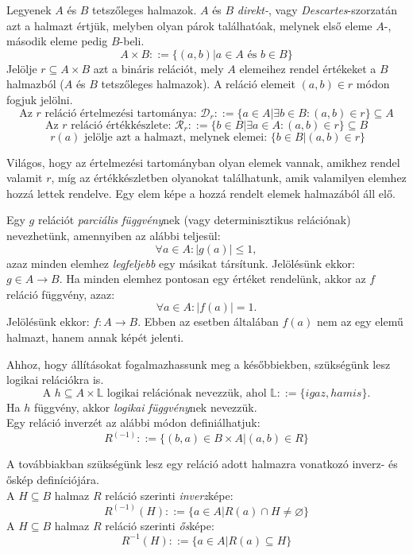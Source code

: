 \documentclass[12pt]{article}
\begin{document}
	Legyenek $A$ és $B$ tetszőleges halmazok. $A$ és $B$ \textit{direkt-}, vagy \textit{Descartes}-szorzatán azt a halmazt értjük, melyben olyan párok találhatóak, melynek első eleme $A$-, második eleme pedig $B$-beli.
	$$A \times B ::= \{ (a,b) | a \in A \text{ és } b \in B \}$$
	Jelölje $r \subseteq A \times B$ azt a bináris relációt, mely $A$ elemeihez rendel értékeket a $B$ halmazból ($A$ és $B$ tetszőleges halmazok). A reláció elemeit $(a,b) \in r $ módon fogjuk jelölni.
	$$ \text{Az } r \text{ reláció értelmezési tartománya: } \mathcal{D}_r ::= \{a \in A | \exists b \in B: (a,b) \in r \} \subseteq A$$
	$$ \text{Az } r \text{ reláció értékkészlete: } \mathcal{R}_r ::= \{b \in B | \exists a \in A: (a,b) \in r \} \subseteq B$$
	$$\ r(a) \text{ jelölje azt a halmazt, melynek elemei: } \{b \in B | (a,b) \in r \} $$
	
	Világos, hogy az értelmezési tartományban olyan elemek vannak, amikhez rendel valamit $r$, míg az értékkészletben olyanokat találhatunk, amik valamilyen elemhez hozzá lettek rendelve. Egy elem képe a hozzá rendelt elemek halmazából áll elő.
	
	Egy $g$ relációt \textit{parciális függvény}nek (vagy determinisztikus relációnak) nevezhetünk, amennyiben az alábbi teljesül:
	$$\forall a \in A : |g(a)| \le 1,$$ azaz minden elemhez \textit{legfeljebb} egy másikat társítunk.
	Jelölésünk ekkor: $g \in A \rightarrow B$.
	Ha minden elemhez pontosan egy értéket rendelünk, akkor az $f$ reláció függvény, azaz:
	$$\forall a \in A : |f(a)| = 1. $$
	Jelölésünk ekkor: $ f: A \rightarrow B $. Ebben az esetben általában $f(a)$ nem az egy elemű halmazt, hanem annak képét jelenti.
	
	Ahhoz, hogy állításokat fogalmazhassunk meg a későbbiekben, szükségünk lesz logikai relációkra is.
	$$\text{A } h \subseteq A \times \mathbb{L} \text{ logikai relációnak nevezzük, ahol } \mathbb{L} ::= \{igaz, hamis\}.$$
	Ha $h$ függvény, akkor \textit{logikai függvény}nek nevezzük.\\
	Egy reláció inverzét az alábbi módon definiálhatjuk:
	$$R^{(-1)} ::= \{(b,a) \in B \times A | (a,b) \in R  \}$$
	
	A továbbiakban szükségünk lesz egy reláció adott halmazra vonatkozó inverz- és őskép definíciójára.\\
	A $H \subseteq B $ halmaz $R$ reláció szerinti \textit{inverz}képe:
	$$ R^{(-1)}(H) ::= \{ a \in A | R(a) \cap H \ne \varnothing \}$$
	A $H \subseteq B $ halmaz $R$ reláció szerinti \textit{ős}képe:
	$$ R^{-1}(H) ::= \{ a \in A | R(a) \subseteq H \}$$
	
\end{document}
